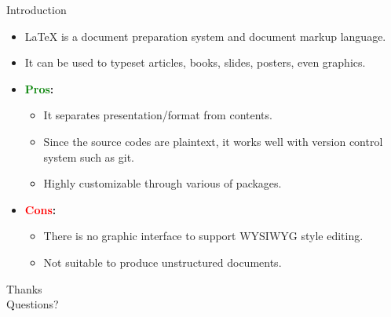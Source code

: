 \documentclass[xcolor={dvipsnames},aspectratio=169,10pt]{beamer}
\begin{document}
\begin{frame}{Introduction}
  \begin{itemize}
    \item \alert{\LaTeX{}} is a document preparation system and document markup language.
    \item It can be used to typeset articles, books, slides, posters, even graphics.
    \item \textbf{\textcolor{Green}{Pros}:}
          \begin{itemize}
            \item It separates presentation/format from contents.
            \item Since the source codes are plaintext, it works well with version control system such as git.
            \item Highly customizable through various of packages.
          \end{itemize}
    \item \textbf{\textcolor{Red}{Cons}:}
          \begin{itemize}
            \item There is no graphic interface to support WYSIWYG style editing.
            \item Not suitable to produce unstructured documents.
          \end{itemize}
  \end{itemize}
\end{frame}




\begin{frame}[standout]
  Thanks \\
  Questions?
\end{frame}
\end{document}
